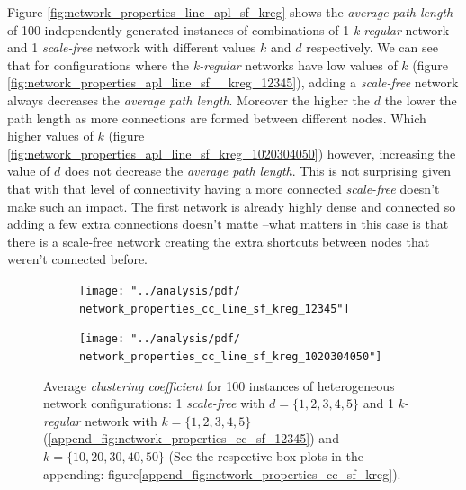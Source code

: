 \documentclass[preprint,number]{elsarticle}
\begin{document}
Figure \ref{fig:network_properties_line_apl_sf_kreg} shows the \textit{average path length} of 100 independently generated instances of combinations of 1 \textit{k-regular} network and 1 \textit{scale-free} network with different values $k$ and $d$ respectively. We can see that for configurations where the \textit{k-regular} networks have low values of $k$ (figure \ref{fig:network_properties_apl_line_sf__kreg_12345}), adding a \textit{scale-free} network always decreases the \textit{average path length}. Moreover the higher the $d$ the lower the path length as more connections are formed between different nodes. Which higher values of $k$ (figure \ref{fig:network_properties_apl_line_sf_kreg_1020304050}) however, increasing the value of $d$ does not decrease the \textit{average path length}. This is not surprising given that with that level of connectivity having a more connected \textit{scale-free} doesn't make such an impact. The first network is already highly dense and connected so adding a few extra connections doesn't matte --what matters in this case is that there is a scale-free network creating the extra shortcuts between nodes that weren't connected before.

\begin{figure}[H]
	\centering
	\begin{subfigure}{.5\linewidth}
		\centering
		\texttt{[image: "../analysis/pdf/ network\_properties\_cc\_line\_sf\_kreg\_12345"]}
		\caption{}
		\label{fig:network_properties_cc_line_sf__kreg_12345}
	\end{subfigure}%
	\begin{subfigure}{.5\linewidth}
		\centering
		\texttt{[image: "../analysis/pdf/ network\_properties\_cc\_line\_sf\_kreg\_1020304050"]}
		\caption{}
		\label{fig:network_properties_cc_line_sf_kreg_1020304050}
	\end{subfigure}
	\begin{minipage}{0.9\textwidth}
		\vspace{0.2cm}
		\caption{Average \textit{clustering coefficient} for 100 instances of heterogeneous network configurations:  1 \textit{scale-free} with $d=\{1,2,3,4,5\}$ and 1 \textit{k-regular} network with $k=\{1,2,3,4,5\}$  (\ref{append_fig:network_properties_cc_sf_12345}) and $k=\{10,20,30,40,50\} $ (See the respective box plots in the appending: figure\ref{append_fig:network_properties_cc_sf_kreg}).}
		\label{fig:network_properties_line_cc_sf_kreg}
	\end{minipage}
\end{figure}
\end{document}
